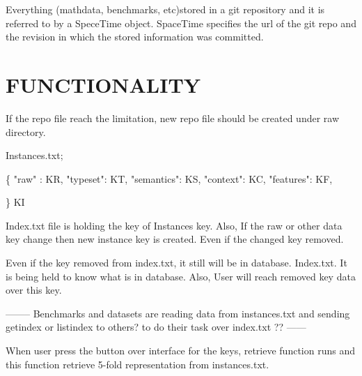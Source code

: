 \documentclass[12pt,twoside]{article}
\newcommand\tab[1][1cm]{\hspace*{#1}}
\begin{document}
	Everything (mathdata, benchmarks, etc)stored in a git repository and it is referred to by a SpeceTime object. SpaceTime specifies the url of the git repo and the revision in which the stored information was committed. 
	
	

	
	\section{FUNCTIONALITY}
	
	
	\par If the repo file reach the limitation, new repo file should be created under raw directory.  
	
	
	Instances.txt;
	
	\{ \newline
	  \tab "raw" : KR, \newline  
	  \tab "typeset": KT,  \newline
	  \tab "semantics": KS, \newline
	  \tab "context": KC, \newline
	  \tab "features": KF, 
	
	\} KI  \newline
	
	Index.txt file is holding the key of Instances key. Also, If the raw or other data key change then new instance key is created. Even if the changed key removed. 
	      	
	Even if the key removed from index.txt, it still will be in database.
	Index.txt. It is being held to know what is in database. Also, User will reach removed key data over this key.
	
	
		
		 -------- Benchmarks and datasets are reading data from instances.txt and sending getindex or listindex to others? to do their task over index.txt ?? ------
		
		
		When user press the button over interface for the keys, retrieve function runs and this function retrieve 5-fold representation from instances.txt. 
\end{document}
